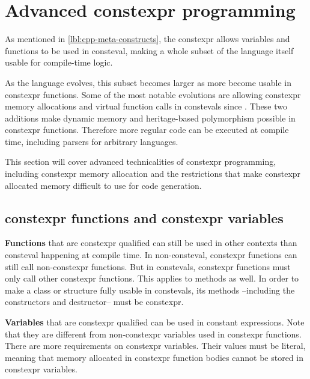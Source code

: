\documentclass[../main]{subfiles}
\begin{document}
\section{
  Advanced constexpr programming
}
\label{lbl:constexpr-programming}


As mentioned in \ref{lbl:cpp-meta-constructs}, the \gls{constexpr}
allows variables and functions to be used in \gls{consteval},
making a whole subset of the \cpp language itself usable for compile-time logic.

As the language evolves, this subset becomes larger as more \cpp become
usable in \gls{constexpr} functions. Some of the most notable evolutions
are allowing \gls{constexpr} memory allocations and virtual function calls
in \glspl{consteval} since .
These two additions make dynamic memory and heritage-based polymorphism
possible in \gls{constexpr} functions. Therefore more regular \cpp code can be
executed at compile time, including parsers for arbitrary languages.

This section will cover advanced technicalities of \gls{constexpr} programming,
including \gls{constexpr} memory allocation and the restrictions that make
\gls{constexpr} allocated memory difficult to use for \cpp code generation.

\subsection{
  \gls{constexpr} functions and \gls{constexpr} variables
}

\textbf{Functions} that are \gls{constexpr} qualified can still be used
in other contexts than \gls{consteval} happening at compile time.
In non-\gls{consteval}, \gls{constexpr} functions can still call
non-\gls{constexpr} functions. But in \glspl{consteval}, \gls{constexpr}
functions must only call other \gls{constexpr} functions.
This applies to methods as well. In order to make a \cpp class or structure
fully usable in \glspl{consteval}, its methods --including the constructors
and destructor-- must be \gls{constexpr}.

\textbf{Variables} that are \gls{constexpr} qualified can be
used in constant expressions. Note that they are different from
non-\gls{constexpr} variables used in \gls{constexpr} functions.
There are more requirements on \gls{constexpr} variables.
Their values must be literal, meaning that memory allocated in \gls{constexpr}
function bodies cannot be stored in \gls{constexpr} variables.
\end{document}
